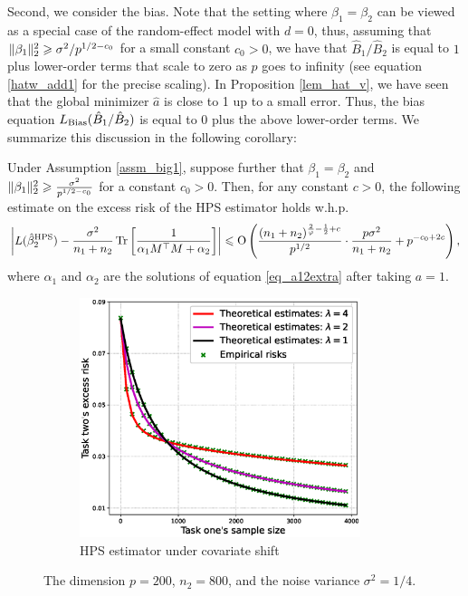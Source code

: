 Second, we consider the bias.
Note that the setting where $\beta_1 = \beta_2$ can be viewed as a special case of the random-effect model with $d = 0$, thus, assuming that $\|\beta_1\|_2^2 \geqslant \sigma^2 / p^{1/2 - c_0}$ for a small constant $c_0 > 0$, we have that $\hat B_1 / \hat B_2$ is equal to $1$ plus lower-order terms that scale to zero as $p$ goes to infinity (see equation \eqref{hatw_add1} for the precise scaling).
In Proposition \ref{lem_hat_v}, we have seen that the global minimizer $\hat a$ is close to 1 up to a small error.
Thus, the bias equation $L_{\textup{Bias}}(\hat B_1 / \hat B_2)$ is equal to $0$ plus the above lower-order terms.
We summarize this discussion in the following corollary:

\begin{corollary}\label{cor_hps_cov}
    Under Assumption \ref{assm_big1}, suppose further that $\beta_1 = \beta_2$ and $\|\beta_1\|^2_2 \geqslant \frac{\sigma^2}{p^{1/2 - c_0}}$ for a constant $c_0 > 0$.
    Then, for any constant $c > 0$, the following estimate on the excess risk of the HPS estimator holds w.h.p.
    \begin{align}
        \bigabs{L(\hat{\beta}_2^{\MTL}) - \frac{\sigma^2}{n_1 + n_2} \bigtr{\frac{1}{\alpha_1 M^{\top} M + \alpha_2}}}
        \le
        \OO\bigbrace{\frac{(n_1+n_2)^{\frac 2{\varphi} - \frac 1 2 + c}}{p^{1/2}}\cdot\frac{p \sigma^2}{n_1+ n_2}
        + p^{-c_0 + 2c}},
    \end{align}
    where $\alpha_1$ and $\alpha_2$ are the solutions of equation \eqref{eq_a12extra} after taking $a = 1$.
\end{corollary}


\begin{figure}[!t]
	\begin{subfigure}[b]{0.5\textwidth}
		\centering
		\includegraphics[width=0.9\textwidth]{figures/covariate_shift.eps}
		\caption{HPS estimator under covariate shift}
		\label{fig_sec3_covariate}
	\end{subfigure}
	\caption{The dimension $p = 200$, $n_2 = 800$, and the noise variance $\sigma^2 = 1/4$.}
\end{figure}

